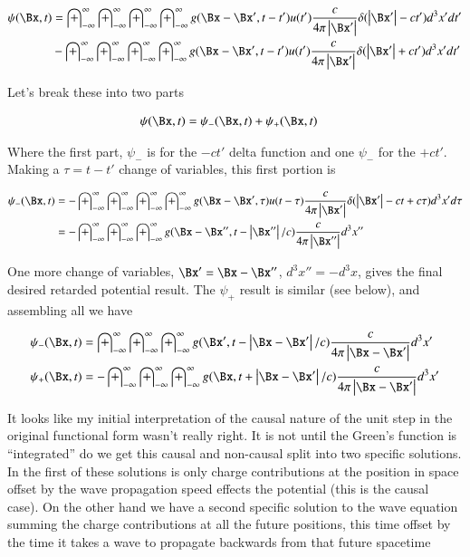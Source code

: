 \documentclass{article}
\newcommand{\IIinf}[0]{ \int_{-\infty}^\infty }
\begin{document}
\begin{align*}
{\psi}(\Bx, t) 
&= 
\IIinf \IIinf \IIinf \IIinf g(\Bx - \Bx', t - t') u(t') \frac{c }{4\pi \Abs{\Bx'}} \delta(\Abs{\Bx'} - c t') d^3 x' dt' \\
&-\IIinf \IIinf \IIinf \IIinf g(\Bx - \Bx', t - t') u(t') \frac{c }{4\pi \Abs{\Bx'}} \delta(\Abs{\Bx'} + c t') d^3 x' dt' \\
\end{align*}

Let's break these into two parts

\begin{align}\label{eqn:almostThere}
{\psi}(\Bx, t) &= {\psi}_{-}(\Bx, t) +{\psi}_{+}(\Bx, t)
\end{align}

Where the first part, $\psi_{-}$ is for the $-ct'$ delta function and one $\psi_{-}$ for the $+ct'$.
Making a $\tau = t-t'$ change of variables, this first portion is

\begin{align*}
{\psi}_{-}(\Bx, t) 
&= -\IIinf \IIinf \IIinf \IIinf g(\Bx - \Bx', \tau) u(t-\tau) \frac{c }{4\pi \Abs{\Bx'}} \delta(\Abs{\Bx'} - c t + c\tau) d^3 x' d\tau \\
&= -\IIinf \IIinf \IIinf g(\Bx - \Bx'', t - \Abs{\Bx''}/c) \frac{c }{4\pi \Abs{\Bx''}} d^3 x'' \\
\end{align*}

One more change of variables, $\Bx' = \Bx - \Bx''$, $d^3 x'' = -d^3 x$, gives the final desired retarded potential result.  The $\psi_{+}$ result is similar (see below), and assembling all we have

\begin{align}
{\psi}_{-}(\Bx, t) &= \IIinf \IIinf \IIinf g(\Bx', t - \Abs{\Bx - \Bx'}/c) \frac{c }{4\pi \Abs{\Bx - \Bx'}} d^3 x' \\
{\psi}_{+}(\Bx, t) &= -\IIinf \IIinf \IIinf g(\Bx, t + \Abs{\Bx -\Bx'}/c) \frac{c }{4\pi \Abs{\Bx -\Bx'}} d^3 x' 
\end{align}

It looks like my initial interpretation of the causal nature of the unit step in the original functional form wasn't really right.  It is not 
until the Green's function is ``integrated'' do we get this causal and non-causal split into two specific solutions.
In the first of these solutions is only charge contributions at the position in space offset by the wave propagation speed effects the
potential (this is the causal case).  On the other hand we have a second specific solution to the wave equation
summing the charge contributions at all the future positions, this time offset by the time it takes a wave to propagate backwards from that future spacetime
\end{document}
